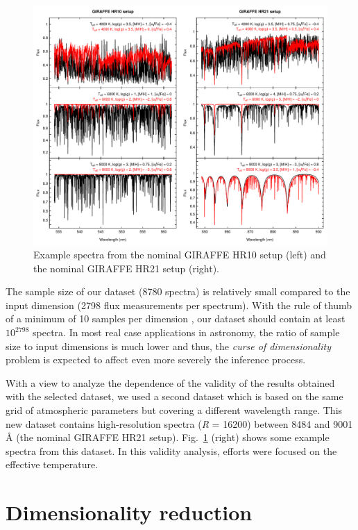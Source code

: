 \documentclass[a4paper,fleqn,usenatbib]{mnras}
\begin{document}
\begin{figure}
	\centering\includegraphics[width=\textwidth]{fig02_espectros_HR10_HR21.pdf}
	\caption{Example spectra from the nominal GIRAFFE 
		HR10 setup (left) and the nominal GIRAFFE HR21 setup (right).}
	\label{fig:ejemplosEspectros}
\end{figure}

The sample size of our dataset (8780 spectra) is relatively
small compared to the input dimension (2798 flux measurements 
per spectrum). With the rule of thumb of a minimum of 10 samples per dimension  
	\citep{jain:00}, our dataset should contain at least $10^{2798}$ spectra.
In most real case applications in astronomy, the ratio of sample size to input 
dimensions is much lower and thus, the \textit{curse of dimensionality} 
problem is expected to affect even more severely the inference process. 

With a view to analyze the dependence of the validity of the results obtained with the 
selected dataset, we used a second dataset which is based on the same 
grid of atmospheric parameters but covering a different wavelength range. This new dataset contains 
high-resolution spectra (\textit{R} = 16200) between 8484 and 9001 
{\AA} (the nominal GIRAFFE HR21 setup). 
Fig.~\ref{fig:ejemplosEspectros} (right) shows some example spectra from 
this dataset. In this validity analysis, efforts were focused on the 
effective temperature.

\section{Dimensionality reduction}
\label{sec:dimred}
\end{document}
